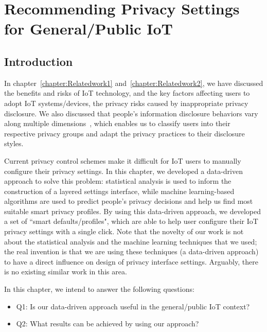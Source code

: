 \chapter{Recommending Privacy Settings for General/Public IoT}\label{chapter:generalIoT}

\section{Introduction}
In chapter~\ref{chapter:Relatedwork1} and~\ref{chapter:Relatedwork2}, we have discussed the benefits and risks of IoT technology, and the key factors affecting users to adopt IoT systems/devices, the privacy risks caused by inappropriate privacy disclosure. We also discussed that people's information disclosure behaviors vary along multiple dimensions~\cite{knijnenburg2013dimensionality}, which enables us to classify users into their respective privacy groups and adapt the privacy practices to their disclosure styles. 

Current privacy control schemes make it difficult for IoT users to manually configure their privacy settings. In this chapter, we developed a data-driven approach to solve this problem: statistical analysis is used to inform the construction of a layered settings interface, while machine learning-based algorithms are used to predict people's privacy decisions and help us find most suitable smart privacy profiles. By using this data-driven approach, we developed a set of ``smart defaults/profiles", which are able to help user configure their IoT privacy settings with a single click. Note that the novelty of our work is not about the statistical analysis and the machine learning techniques that we used; the real invention is that we are using these techniques (a data-driven approach) to have a direct influence on design of privacy interface settings. Arguably, there is no existing similar work in this area.

In this chapter, we intend to answer the following questions:
\begin{itemize}
	\item Q1: Is our data-driven approach useful in the general/public IoT context?
	\item Q2: What results can be achieved by using our approach?
\end{itemize}

